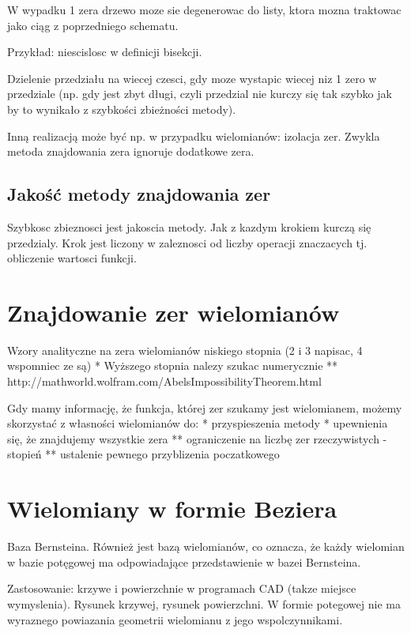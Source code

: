\documentclass[11pt,a4paper,oneside]{report}
\begin{document}
W wypadku 1 zera drzewo moze sie degenerowac do listy, ktora mozna traktowac jako ciąg z poprzedniego schematu.

Przykład: niescislosc w definicji bisekcji.

Dzielenie przedziału na wiecej czesci, gdy moze wystapic wiecej niz 1 zero w przedziale (np. gdy jest zbyt długi, czyli przedzial nie kurczy się tak szybko jak by to wynikało z szybkości zbieżności metody).

Inną realizacją może być np. w przypadku wielomianów: izolacja zer. Zwykla metoda znajdowania zera ignoruje dodatkowe zera.

\subsection{Jakość metody znajdowania zer}

Szybkosc zbieznosci jest jakoscia metody. Jak z kazdym krokiem kurczą się przedzialy. Krok jest liczony w zaleznosci od liczby operacji znaczacych tj. obliczenie wartosci funkcji.

\section{Znajdowanie zer wielomianów}

Wzory analityczne na zera wielomianów niskiego stopnia (2 i 3 napisac, 4 wspomniec ze są)
* Wyższego stopnia nalezy szukac numerycznie
** http://mathworld.wolfram.com/AbelsImpossibilityTheorem.html


Gdy mamy informację, że funkcja, której zer szukamy jest wielomianem, możemy skorzystać z własności wielomianów do:
* przyspieszenia metody
* upewnienia się, że znajdujemy wszystkie zera
** ograniczenie na liczbę zer rzeczywistych - stopień
** ustalenie pewnego przyblizenia poczatkowego



\section{Wielomiany w formie Beziera}

Baza Bernsteina. Również jest bazą wielomianów, co oznacza, że każdy wielomian w bazie potęgowej ma odpowiadające przedstawienie w bazei Bernsteina.

Zastosowanie: krzywe i powierzchnie w programach CAD (takze miejsce wymyslenia). Rysunek krzywej, rysunek powierzchni. W formie potegowej nie ma wyraznego powiazania geometrii wielomianu z jego wspolczynnikami. 
\end{document}
